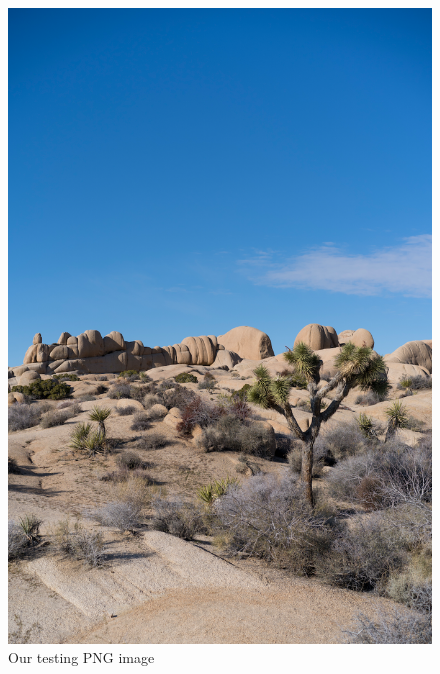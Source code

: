 \documentclass{article}
\begin{document}
\begin{figure}[htb]
\begin{minipage}[b]{0.36\textwidth}
        \includegraphics[width=\textwidth]{../Resource/image.png}
        \caption{Our testing PNG image}
    \label{fig:our-image}
    \end{minipage}
    \hfill
\end{figure}
\end{document}
